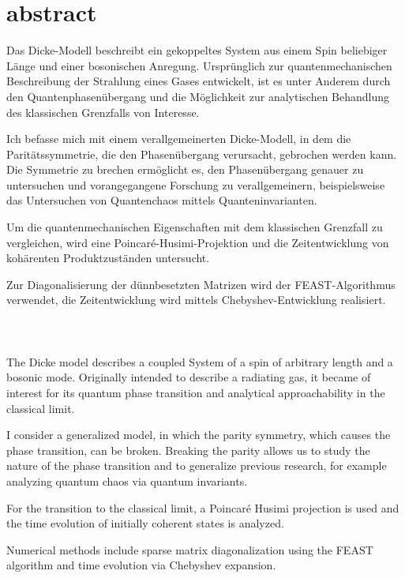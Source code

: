 \section{abstract}

Das Dicke-Modell beschreibt ein gekoppeltes System aus einem Spin beliebiger Länge und einer bosonischen Anregung.
Ursprünglich zur quantenmechanischen Beschreibung der Strahlung eines Gases entwickelt, ist es unter Anderem durch den Quantenphasenübergang und die Möglichkeit zur analytischen Behandlung des klassischen Grenzfalls von Interesse. 

Ich befasse mich mit einem verallgemeinerten Dicke-Modell, in dem die Paritätssymmetrie, die den Phasenübergang verursacht, gebrochen werden kann.
Die Symmetrie zu brechen ermöglicht es, den Phasenübergang genauer zu untersuchen und vorangegangene Forschung zu verallgemeinern, beispielsweise das Untersuchen von Quantenchaos mittels Quanteninvarianten.

Um die quantenmechanischen Eigenschaften mit dem klassischen Grenzfall zu vergleichen, wird eine Poincar\'{e}-Husimi-Projektion und die Zeitentwicklung von kohärenten Produktzuständen untersucht.

Zur Diagonalisierung der dünnbesetzten Matrizen wird der FEAST-Algorithmus verwendet, die Zeitentwicklung wird mittels Chebyshev-Entwicklung realisiert.\\
\ \\
\ \\
\ \\
The Dicke model describes a coupled System of a spin of arbitrary length and a bosonic mode.
Originally intended to describe  a radiating gas, it became of interest for its quantum phase transition and analytical approachability in the classical limit. 

I consider a generalized model, in which the parity symmetry, which causes the phase transition, can be broken.
Breaking the parity allows us to study the nature of the phase transition and to generalize previous research, for example analyzing quantum chaos via quantum invariants.

For the transition to the classical limit, a Poincar\'{e} Husimi projection is used and the time evolution of initially coherent states is analyzed.

Numerical methods include sparse matrix diagonalization using the FEAST algorithm and time evolution via Chebyshev expansion.
